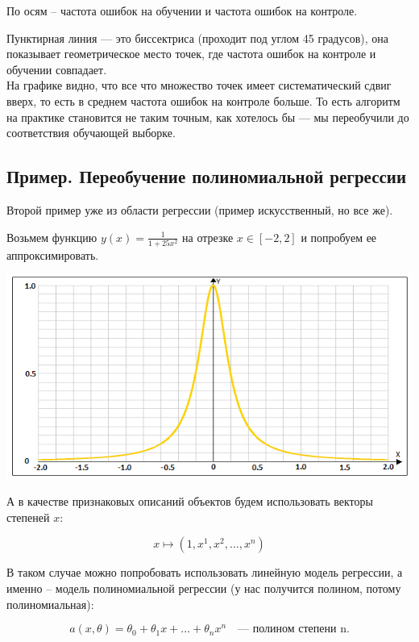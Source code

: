 \documentclass{article}
\begin{document}
По осям -- частота ошибок на обучении и частота ошибок на контроле.

Пунктирная линия --- это биссектриса (проходит под углом 45 градусов), она показывает геометрическое место точек, где частота ошибок на контроле и обучении совпадает.
\\

На графике видно, что все что множество точек имеет систематический сдвиг вверх, то есть в среднем частота ошибок на контроле больше. То есть алгоритм на практике становится не таким точным, как хотелось бы --- мы переобучили до соответствия обучающей выборке.
\\

\subsection{Пример. Переобучение полиномиальной регрессии}

Второй пример уже из области регрессии (пример искусственный, но все же).

Возьмем функцию $y(x) = \frac{1}{1 + 25 x^2}$ на отрезке $x \in [-2, 2]$ и попробуем ее аппроксимировать.

\begin{center}
    \includegraphics[scale=0.8]{images/2_2.png}
\end{center}

А в качестве признаковых описаний объектов будем использовать векторы степеней $x$:

$$x \mapsto (1, x^1, x^2, \ldots, x^n)$$

В таком случае можно попробовать использовать линейную модель регрессии, а именно -- модель полиномиальной регрессии (у нас получится полином, потому полиномиальная):

$$a(x, \theta) = \theta_0 + \theta_1 x + \ldots + \theta_n x^n
\quad\text{--- полином степени n.}$$
\end{document}
